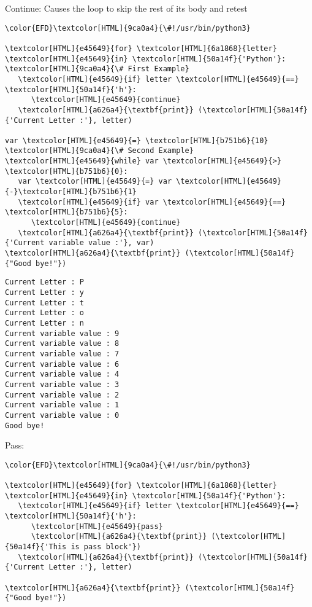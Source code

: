 \documentclass{scrartcl}
\begin{document}
Continue: Causes the loop to skip the rest of its body and retest
\begin{Code}
\begin{Verbatim}[]
\color{EFD}\textcolor[HTML]{9ca0a4}{\#!/usr/bin/python3}

\textcolor[HTML]{e45649}{for} \textcolor[HTML]{6a1868}{letter} \textcolor[HTML]{e45649}{in} \textcolor[HTML]{50a14f}{'Python'}:     \textcolor[HTML]{9ca0a4}{\# First Example}
   \textcolor[HTML]{e45649}{if} letter \textcolor[HTML]{e45649}{==} \textcolor[HTML]{50a14f}{'h'}:
      \textcolor[HTML]{e45649}{continue}
   \textcolor[HTML]{a626a4}{\textbf{print}} (\textcolor[HTML]{50a14f}{'Current Letter :'}, letter)

var \textcolor[HTML]{e45649}{=} \textcolor[HTML]{b751b6}{10}                    \textcolor[HTML]{9ca0a4}{\# Second Example}
\textcolor[HTML]{e45649}{while} var \textcolor[HTML]{e45649}{>} \textcolor[HTML]{b751b6}{0}:
   var \textcolor[HTML]{e45649}{=} var \textcolor[HTML]{e45649}{-}\textcolor[HTML]{b751b6}{1}
   \textcolor[HTML]{e45649}{if} var \textcolor[HTML]{e45649}{==} \textcolor[HTML]{b751b6}{5}:
      \textcolor[HTML]{e45649}{continue}
   \textcolor[HTML]{a626a4}{\textbf{print}} (\textcolor[HTML]{50a14f}{'Current variable value :'}, var)
\textcolor[HTML]{a626a4}{\textbf{print}} (\textcolor[HTML]{50a14f}{"Good bye!"})
\end{Verbatim}
\end{Code}

\begin{Code}[alt]
\begin{verbatim}
Current Letter : P
Current Letter : y
Current Letter : t
Current Letter : o
Current Letter : n
Current variable value : 9
Current variable value : 8
Current variable value : 7
Current variable value : 6
Current variable value : 4
Current variable value : 3
Current variable value : 2
Current variable value : 1
Current variable value : 0
Good bye!
\end{verbatim}
\end{Code}

Pass:
\begin{Code}
\begin{Verbatim}[]
\color{EFD}\textcolor[HTML]{9ca0a4}{\#!/usr/bin/python3}

\textcolor[HTML]{e45649}{for} \textcolor[HTML]{6a1868}{letter} \textcolor[HTML]{e45649}{in} \textcolor[HTML]{50a14f}{'Python'}:
   \textcolor[HTML]{e45649}{if} letter \textcolor[HTML]{e45649}{==} \textcolor[HTML]{50a14f}{'h'}:
      \textcolor[HTML]{e45649}{pass}
      \textcolor[HTML]{a626a4}{\textbf{print}} (\textcolor[HTML]{50a14f}{'This is pass block'})
   \textcolor[HTML]{a626a4}{\textbf{print}} (\textcolor[HTML]{50a14f}{'Current Letter :'}, letter)

\textcolor[HTML]{a626a4}{\textbf{print}} (\textcolor[HTML]{50a14f}{"Good bye!"})
\end{Verbatim}
\end{Code}
\end{document}
